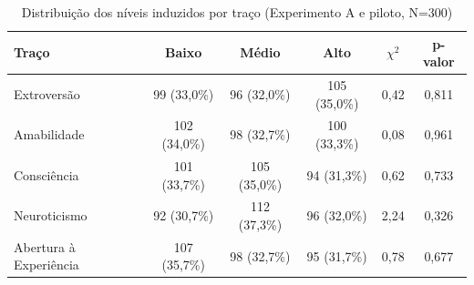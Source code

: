 \begin{table}[htb]
    \caption{Distribuição dos níveis induzidos por traço (Experimento A e piloto, N=300)}
    \label{tab:aleat-frequencias}
    \centering
    \small
    \begin{tabular}{lccccc}
        \toprule
        Traço & Baixo & Médio & Alto & $\chi^2$ & p-valor \\
        \midrule
        Extroversão & 99 (33,0\%) & 96 (32,0\%) & 105 (35,0\%) & 0,42 & 0,811 \\
        Amabilidade & 102 (34,0\%) & 98 (32,7\%) & 100 (33,3\%) & 0,08 & 0,961 \\
        Consciência & 101 (33,7\%) & 105 (35,0\%) & 94 (31,3\%) & 0,62 & 0,733 \\
        Neuroticismo & 92 (30,7\%) & 112 (37,3\%) & 96 (32,0\%) & 2,24 & 0,326 \\
        Abertura à Experiência & 107 (35,7\%) & 98 (32,7\%) & 95 (31,7\%) & 0,78 & 0,677 \\
        \bottomrule
    \end{tabular}
\end{table}
